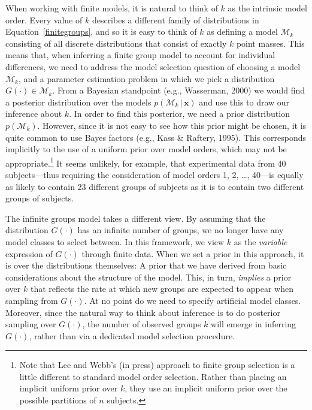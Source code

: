 \documentclass[authoryear]{elsarticle}
\newcommand{\condon}{\,|\,}
\newcommand{\vctr}[1]{\bm{#1}}
\begin{document}
When working with finite models, it is natural to think of $k$ as the
intrinsic model order. Every value of $k$ describes a different family
of distributions in Equation~\ref{finitegroups}, and so it is easy
to think of $k$ as defining a model $\mathcal{M}_k$ consisting of
all discrete distributions that consist of exactly $k$ point masses.
This means that, when inferring a finite group model to account for individual differences,
we need to address the model selection question of choosing a
model $\mathcal{M}_k$, and a parameter estimation problem in which
we pick a distribution $G(\cdot) \in \mathcal{M}_k$. From a Bayesian
standpoint (e.g., Wasserman, 2000) we would find a posterior distribution
over the models $p(\mathcal{M}_k \condon \vctr{x})$ and use this
to draw our inference about $k$. In order to find this posterior, we need
a prior distribution $p(\mathcal{M}_k)$. However, since it is not easy
to see how this prior might be chosen, it is quite common to use
 Bayes factors (e.g., Kass \& Raftery,  1995). This corresponds implicitly to the use of a uniform prior over
model orders, which may not be appropriate.\footnote{Note
that Lee and Webb's (in press) approach to finite group selection is a
little different to standard model order selection. Rather than placing
an implicit uniform prior over $k$, they use an implicit uniform prior
over the possible partitions of $n$ subjects.}
It seems unlikely, for example, that experimental data from 40 subjects---thus
requiring the consideration of model orders 1, 2, \ldots, 40---is equally as likely
to contain 23 different groups of subjects as it is to contain two different groups of subjects.

The infinite groups model takes a different view. By assuming that
the distribution $G(\cdot)$ has an infinite number of groups, we
no longer have any model classes to select between. In this framework,
we view $k$ as the \emph{variable} expression of $G(\cdot)$
through finite data. When we set a prior in this approach, it is
over the distributions themselves: A prior that we have derived from
basic considerations about the structure of the model. This, in turn,
\emph{implies} a prior over $k$ that reflects the rate at
which new groups are expected to appear when sampling from
$G(\cdot)$. At no point do we need to specify artificial model classes.
Moreover, since the natural way to think about inference
is to do posterior sampling over $G(\cdot)$, the number of observed
groups $k$ will emerge in inferring
$G(\cdot)$, rather than via a dedicated model selection
procedure.
\end{document}
